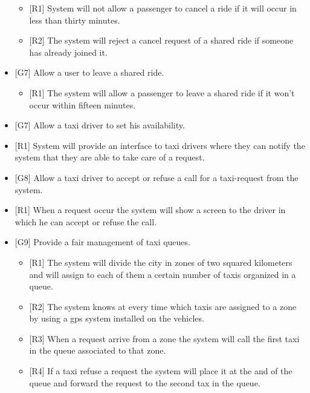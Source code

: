 \begin{itemize}
\begin{itemize}
				\item {[R1]} System will not allow a passenger to cancel a ride if it will occur in less than thirty minutes.
				\item {[R2]} The system will reject a cancel request of a shared ride if someone has already joined it.
			\end{itemize}
		\item {[G7]} Allow a user to leave a shared ride.
			\begin{itemize}
				\item {[R1]} The system will allow a passenger to leave a shared ride if it won't occur within fifteen minutes.
			\end{itemize}
		\item {[G7]} Allow a taxi driver to set his availability.
			\item {[R1]} System will provide an interface to taxi drivers where they can notify the system that they are able to take care of a request.
		\item {[G8]} Allow a taxi driver to accept or refuse a call for a taxi-request from the system.
			\item {[R1]} When a request occur the system will show a screen to the driver in which he can accept or refuse the call.
		\item {[G9]} Provide a fair management of taxi queues.
			\begin{itemize}
				\item {[R1]} The system will divide the city in zones of two squared kilometers and will assign to each of them a certain number of taxis organized in a queue.
				\item {[R2]} The system knows at every time which taxis are assigned to a zone by using a gps system installed on the vehicles.
				\item {[R3]} When a request arrive from a zone the system will call the first taxi in the queue associated to that zone.
				\item {[R4]} If a taxi refuse a request the system will place it at the and of the queue and forward the request to the second tax in the queue.
			\end{itemize}
		\end{itemize}